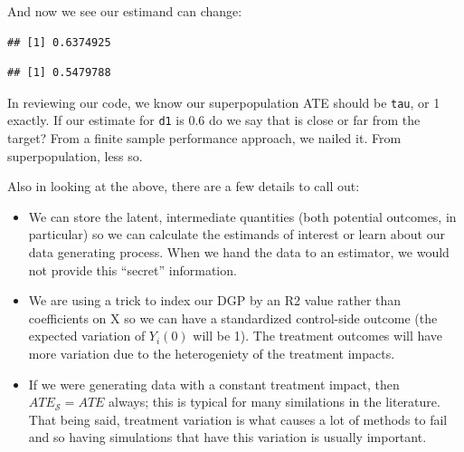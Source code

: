 \documentclass[
]{book}
\newenvironment{Shaded}{\begin{snugshade}}{\end{snugshade}}
\newcommand{\DecValTok}[1]{\textcolor[rgb]{0.00,0.00,0.81}{#1}}
\newcommand{\FunctionTok}[1]{\textcolor[rgb]{0.00,0.00,0.00}{#1}}
\newcommand{\NormalTok}[1]{#1}
\newcommand{\OtherTok}[1]{\textcolor[rgb]{0.56,0.35,0.01}{#1}}
\newcommand{\SpecialCharTok}[1]{\textcolor[rgb]{0.00,0.00,0.00}{#1}}
\providecommand{\tightlist}{%
  \setlength{\itemsep}{0pt}\setlength{\parskip}{0pt}}
\begin{document}
And now we see our estimand can change:

\begin{Shaded}
\end{Shaded}

\begin{verbatim}
## [1] 0.6374925
\end{verbatim}

\begin{Shaded}
\end{Shaded}

\begin{verbatim}
## [1] 0.5479788
\end{verbatim}

In reviewing our code, we know our superpopulation ATE should be \texttt{tau}, or 1 exactly.
If our estimate for \texttt{d1} is 0.6 do we say that is close or far from the target?
From a finite sample performance approach, we nailed it.
From superpopulation, less so.

Also in looking at the above, there are a few details to call out:

\begin{itemize}
\tightlist
\item
  We can store the latent, intermediate quantities (both potential outcomes, in particular) so we can calculate the estimands of interest or learn about our data generating process. When we hand the data to an estimator, we would not provide this ``secret'' information.
\item
  We are using a trick to index our DGP by an R2 value rather than coefficients on X so we can have a standardized control-side outcome (the expected variation of \(Y_i(0)\) will be 1). The treatment outcomes will have more variation due to the heterogeniety of the treatment impacts.
\item
  If we were generating data with a constant treatment impact, then \(ATE_{\mathcal{S}} = ATE\) always; this is typical for many similations in the literature. That being said, treatment variation is what causes a lot of methods to fail and so having simulations that have this variation is usually important.
\end{itemize}
\end{document}
